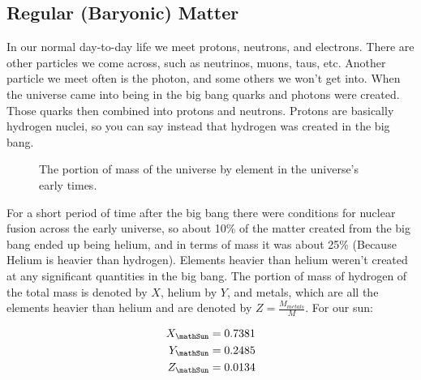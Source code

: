 \subsection{Regular (Baryonic) Matter}

In our normal day-to-day life we meet protons, neutrons, and electrons. There are other particles we come across, such as neutrinos, muons, taus, etc. Another particle we meet often is the photon, and some others we won't get into. When the universe came into being in the big bang quarks and photons were created. Those quarks then combined into protons and neutrons. Protons are basically hydrogen nuclei, so you can say instead that hydrogen was created in the big bang.
\begin{figure}
	\caption{The portion of mass of the universe by element in the universe's early times.}
\end{figure}
For a short period of time after the big bang there were conditions for nuclear fusion across the early universe, so about 10\% of the matter created from the big bang ended up being helium, and in terms of mass it was about 25\% (Because Helium is heavier than hydrogen). Elements heavier than helium weren't created at any significant quantities in the big bang. The portion of mass of hydrogen of the total mass is denoted by \(X\), helium by \(Y\), and metals, which are all the elements heavier than helium and are denoted by \(Z=\frac{M_{metals}}{M}\). For our sun:

\begin{align}
	X_\mathSun &= 0.7381\\
	Y_\mathSun &= 0.2485\\
	Z_\mathSun &= 0.0134
\end{align}

